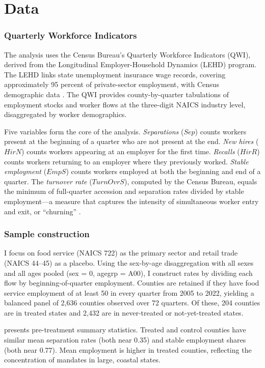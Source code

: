 \documentclass[12pt]{article}
\begin{document}
\section{Data}\label{sec:data}

\subsubsection*{Quarterly Workforce Indicators} The analysis uses the Census Bureau's Quarterly Workforce Indicators (QWI), derived from the Longitudinal Employer-Household Dynamics (LEHD) program. The LEHD links state unemployment insurance wage records, covering approximately 95 percent of private-sector employment, with Census demographic data \citep{Abowd2009}. The QWI provides county-by-quarter tabulations of employment stocks and worker flows at the three-digit NAICS industry level, disaggregated by worker demographics.

Five variables form the core of the analysis. \textit{Separations} ($Sep$) counts workers present at the beginning of a quarter who are not present at the end. \textit{New hires} ($HirN$) counts workers appearing at an employer for the first time. \textit{Recalls} ($HirR$) counts workers returning to an employer where they previously worked. \textit{Stable employment} ($EmpS$) counts workers employed at both the beginning and end of a quarter. The \textit{turnover rate} ($TurnOvrS$), computed by the Census Bureau, equals the minimum of full-quarter accession and separation rates divided by stable employment---a measure that captures the intensity of simultaneous worker entry and exit, or ``churning'' \citep{Burgess2000}.

\subsubsection*{Sample construction} I focus on food service (NAICS 722) as the primary sector and retail trade (NAICS 44--45) as a placebo. Using the sex-by-age disaggregation with all sexes and all ages pooled (sex = 0, agegrp = A00), I construct rates by dividing each flow by beginning-of-quarter employment. Counties are retained if they have food service employment of at least 50 in every quarter from 2005 to 2022, yielding a balanced panel of 2,636 counties observed over 72 quarters. Of these, 204 counties are in treated states and 2,432 are in never-treated or not-yet-treated states.

 presents pre-treatment summary statistics. Treated and control counties have similar mean separation rates (both near 0.35) and stable employment shares (both near 0.77). Mean employment is higher in treated counties, reflecting the concentration of mandates in large, coastal states.
\end{document}
